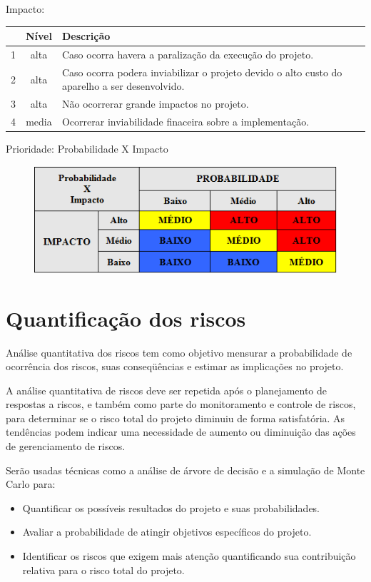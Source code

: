 \documentclass[12pt,openright,oneside,a4paper,brazil]{abntex2}
\begin{document}
Impacto:
\begin{table}[h]
\centering
\begin{tabular}{|c|c|p{13.3cm}|}

  & Nível & Descrição\\
\hline                               
1 & alta & Caso ocorra havera a paralização da execução do projeto. \\
\hline
2 & alta & Caso ocorra podera inviabilizar o projeto devido o alto custo do aparelho a ser desenvolvido.\\
\hline
3 & alta & Não ocorrerar grande impactos no projeto.\\
\hline
4 & media & Ocorrerar inviabilidade finaceira sobre a implementação. \\
\hline
\end{tabular}
\end{table}

Prioridade: Probabilidade X Impacto
\begin{figure}[h]
\begin{center}

\includegraphics[scale=0.65]{prioridade}
\label{Prioridade}
\end{center}
\end{figure}
\FloatBarrier

\section{Quantificação dos riscos}
Análise quantitativa dos riscos tem como objetivo mensurar a probabilidade de ocorrência dos riscos, suas conseqüências e estimar as implicações no projeto.

A análise quantitativa de riscos deve ser repetida após o planejamento de respostas a riscos, e também como parte do monitoramento e controle de riscos, para determinar se o risco total do projeto diminuiu de forma satisfatória. As tendências podem indicar uma necessidade de aumento ou diminuição das ações de gerenciamento de riscos.

Serão usadas técnicas como a análise de árvore de decisão e a simulação de Monte Carlo para:
\begin{itemize}
\item Quantificar os possíveis resultados do projeto e suas probabilidades.
\item Avaliar a probabilidade de atingir objetivos específicos do projeto.
\item Identificar os riscos que exigem mais atenção quantificando sua contribuição relativa para o risco total do projeto.

\end{itemize}
\end{document}

